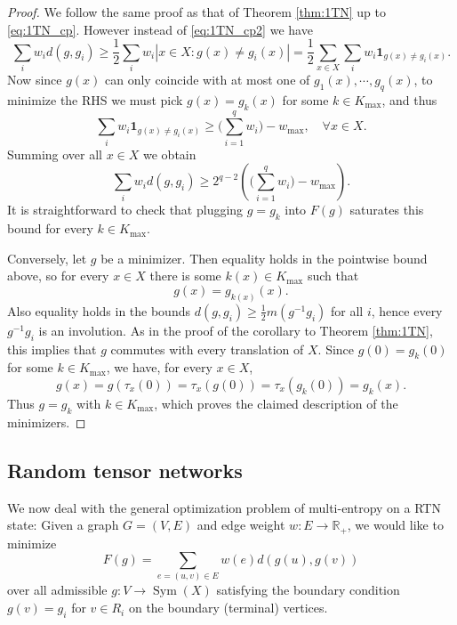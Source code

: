 \documentclass[11pt,oneside,letterpaper]{article}
\numberwithin{equation}{section}
\theoremstyle{definition}
\theoremstyle{remark}
\DeclareMathOperator{\Sym}{Sym}
\begin{document}
\begin{proof}
  We follow the same proof as that of Theorem \ref{thm:1TN} up to \eqref{eq:1TN_cp}. However instead of \eqref{eq:1TN_cp2} we have
  \begin{equation}
    \sum_i w_i d(g,g_i) \ge \frac{1}{2}\sum_i w_i|x\in X:g(x)\ne g_i(x)|=\frac{1}{2}\sum_{x\in X}\sum_i w_i\mathbf{1}_{g(x)\ne g_i(x)}.
  \end{equation}
  Now since $g(x)$ can only coincide with at most one of $g_1(x),\cdots,g_q(x)$, to minimize the RHS we must pick $g(x)=g_k(x)$ for some $k\in K_{\max}$, and thus
  \begin{equation}
    \sum_i w_i \mathbf{1}_{g(x)\ne g_i(x)} \ge \Big(\sum_{i=1}^q w_i \Big)-w_{\max} , \quad \forall x\in X.
  \end{equation}
  Summing over all $x\in X$ we obtain
  \begin{equation}
    \sum_i w_i d(g,g_i) \ge 2^{q-2}\left(\Big(\sum_{i=1}^q w_i \Big) -w_{\max}\right).
  \end{equation}
  It is straightforward to check that plugging $g=g_k$ into $F(g)$ saturates this bound for every $k\in K_{\max}$.

  Conversely, let $g$ be a minimizer. Then equality holds in the pointwise bound above, so for every $x\in X$ there is some $k(x)\in K_{\max}$ such that
  \begin{equation}
    g(x)=g_{k(x)}(x).
  \end{equation}
  Also equality holds in the bounds $d(g,g_i)\ge \frac{1}{2}m(g^{-1}g_i)$ for all $i$, hence every $g^{-1}g_i$ is an involution. As in the proof of the corollary to Theorem \ref{thm:1TN}, this implies that $g$ commutes with every translation of $X$. Since $g(0)=g_k(0)$ for some $k\in K_{\max}$, we have, for every $x\in X$,
  \begin{equation}
    g(x)=g(\tau_x(0))=\tau_x(g(0))=\tau_x(g_k(0))=g_k(x).
  \end{equation}
  Thus $g=g_k$ with $k\in K_{\max}$, which proves the claimed description of the minimizers.
\end{proof}

\subsection{Random tensor networks}
We now deal with the general optimization problem of multi-entropy on a RTN state:
Given a graph $G=(V,E)$ and edge weight $w:E\to \mathbb{R}_+$, we would like to minimize
\begin{equation}
  \label{eq:RTN_F(g)}
  F(g) = \sum_{e=(u,v)\in E} w(e) d(g(u),g(v))
\end{equation}
over all admissible $g:V\to \Sym(X)$ satisfying the boundary condition $g(v)=g_i$ for $v\in R_i$ on the boundary (terminal) vertices.
\end{document}
